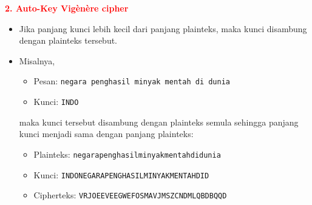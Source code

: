 \documentclass{article}
\begin{document}

\textcolor{red}{\textbf{2. Auto-Key Vig\`en\`ere cipher}}

\begin{itemize}
    \item Jika panjang kunci lebih kecil dari panjang plainteks, maka kunci disambung dengan plainteks tersebut.
    \item Misalnya,
    \begin{itemize}
        \item Pesan: \texttt{negara penghasil minyak mentah di dunia}
        \item Kunci: \texttt{INDO}
    \end{itemize}
    maka kunci tersebut disambung dengan plainteks semula sehingga panjang kunci menjadi sama dengan panjang plainteks:
    \begin{itemize}
        \item Plainteks: \texttt{negarapenghasilminyakmentahdidunia}
        \item Kunci: \texttt{INDONEGARAPENGHASILMINYAKMENTAHDID}
        \item Cipherteks: \texttt{VRJOEEVEEGWEFOSMAVJMSZCNDMLQBDBQQD}
    \end{itemize}
\end{itemize}
\end{document}

